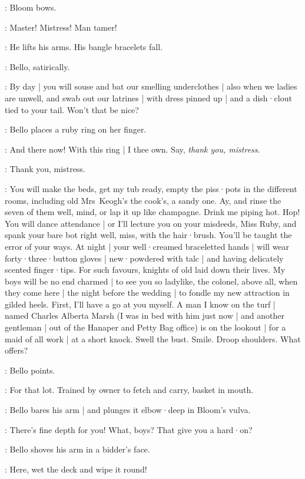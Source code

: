:
Bloom bows.

\Bloom:
Master!
Mistress!
Man tamer!

:
He lifts his arms.
His bangle bracelets fall.

:
Bello,
satirically.

\Bello:
By day |
you will souse and bat our smelling underclothes |
also when we ladies are unwell,
and swab out our latrines |
with dress pinned up |
and a dish·clout tied to your tail.
Won't that be nice?

:
Bello places a ruby ring on her finger.

\Bello:
And there now!
With this ring |
I thee own.
Say,
\emph{thank you,
mistress}.

\Bloom:
Thank you,
mistress.

\Bello:
You will make the beds,
get my tub ready,
empty the piss·pots in the different rooms,
including old Mrs~Keogh's the cook's,
a sandy one.
Ay,
and rinse the seven of them well,
mind,
or lap it up like champagne.
Drink me piping hot.
Hop!
You will dance attendance |
or I'll lecture you on your misdeeds,
Miss Ruby,
and spank your bare bot right well,
miss,
with the hair·brush.
You'll be taught the error of your ways.
At night |
your well·creamed braceletted hands |
will wear forty·three·button gloves |
new·powdered with talc |
and having delicately scented finger·tips.
%
For such favours,
knights of old laid down their lives.
My boys will be no end charmed |
to see you so ladylike,
the colonel,
above all,
when they come here |
the night before the wedding |
to fondle my new attraction in gilded heels.
First,
I'll have a go at you myself.
A man I know on the turf |
named Charles Alberta Marsh
(I was in bed with him just now |
and another gentleman |
out of the Hanaper and Petty Bag office)
is on the lookout |
for a maid of all work |
at a short knock.
Swell the bust.
Smile.
Droop shoulders.
What offers?

:
Bello points.

\Bello:
For that lot.
Trained by owner to fetch and carry,
basket in mouth.

:
Bello bares his arm |
and plunges it elbow·deep in Bloom's vulva.

\Bello:
There's fine depth for you!
What,
boys?
That give you a hard·on?

:
Bello shoves his arm in a bidder's face.

\Bello:
Here,
wet the deck and wipe it round!

